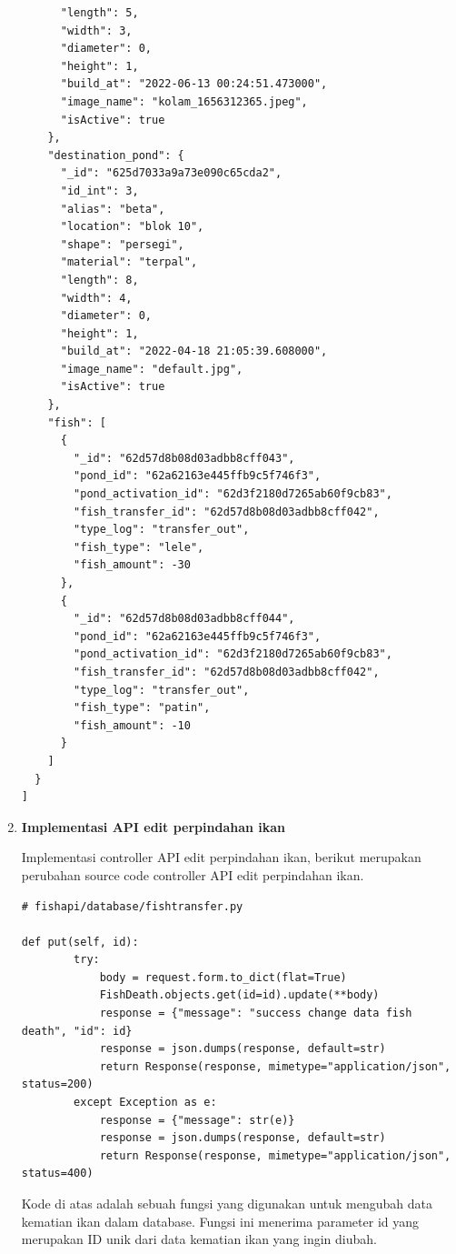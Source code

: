 \begin{enumerate}[1.]
\begin{lstlisting}
      "length": 5,
      "width": 3,
      "diameter": 0,
      "height": 1,
      "build_at": "2022-06-13 00:24:51.473000",
      "image_name": "kolam_1656312365.jpeg",
      "isActive": true
    },
    "destination_pond": {
      "_id": "625d7033a9a73e090c65cda2",
      "id_int": 3,
      "alias": "beta",
      "location": "blok 10",
      "shape": "persegi",
      "material": "terpal",
      "length": 8,
      "width": 4,
      "diameter": 0,
      "height": 1,
      "build_at": "2022-04-18 21:05:39.608000",
      "image_name": "default.jpg",
      "isActive": true
    },
    "fish": [
      {
        "_id": "62d57d8b08d03adbb8cff043",
        "pond_id": "62a62163e445ffb9c5f746f3",
        "pond_activation_id": "62d3f2180d7265ab60f9cb83",
        "fish_transfer_id": "62d57d8b08d03adbb8cff042",
        "type_log": "transfer_out",
        "fish_type": "lele",
        "fish_amount": -30
      },
      {
        "_id": "62d57d8b08d03adbb8cff044",
        "pond_id": "62a62163e445ffb9c5f746f3",
        "pond_activation_id": "62d3f2180d7265ab60f9cb83",
        "fish_transfer_id": "62d57d8b08d03adbb8cff042",
        "type_log": "transfer_out",
        "fish_type": "patin",
        "fish_amount": -10
      }
    ]
  }
]
\end{lstlisting}



\item \textbf{Implementasi API edit perpindahan ikan}

Implementasi controller API edit perpindahan ikan, berikut merupakan perubahan source code controller API edit perpindahan ikan.

\begin{lstlisting}
# fishapi/database/fishtransfer.py

def put(self, id):
        try:
            body = request.form.to_dict(flat=True)
            FishDeath.objects.get(id=id).update(**body)
            response = {"message": "success change data fish death", "id": id}
            response = json.dumps(response, default=str)
            return Response(response, mimetype="application/json", status=200)
        except Exception as e:
            response = {"message": str(e)}
            response = json.dumps(response, default=str)
            return Response(response, mimetype="application/json", status=400)
\end{lstlisting}

Kode di atas adalah sebuah fungsi yang digunakan untuk mengubah data kematian ikan dalam database. Fungsi ini menerima parameter id yang merupakan ID unik dari data kematian ikan yang ingin diubah.


\end{enumerate}
